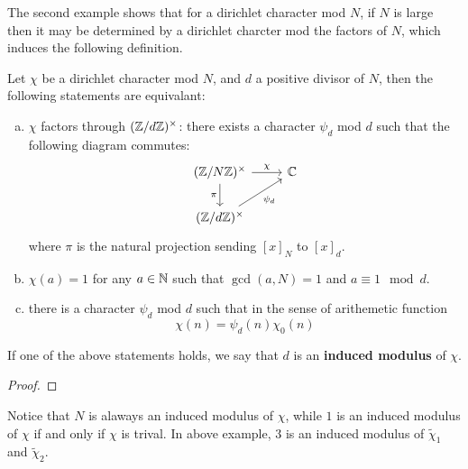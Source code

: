 The second example shows that for a dirichlet character mod \(N\), if \(N\) is large then it may be determined by a dirichlet charcter mod the factors of \(N\), which induces the following definition.

\begin{lemma}
    Let \(\chi\) be a dirichlet character mod \(N\), and \(d \) a positive divisor of \(N\), then the following statements are equivalant:
    \begin{enumerate} [(a)]
        \item \(\chi\) factors through \((\mathbb{Z}/d\mathbb{Z})^\times\): there exists a character \(\psi_d\) mod \(d\) such that the following diagram commutes:
\[\begin{tikzcd}
	{(\mathbb{Z}/N\mathbb{Z})^\times} & {\mathbb{C}} \\
	{(\mathbb{Z}/d\mathbb{Z})^\times}
	\arrow["\chi", from=1-1, to=1-2]
	\arrow["\pi"', from=1-1, to=2-1]
	\arrow["{\psi_d}"', from=2-1, to=1-2]
\end{tikzcd}\]
        where \(\pi\) is the natural projection sending \([x]_N\) to \([x]_d\).
        \item \(\chi(a) = 1\) for any \(a \in \mathbb{N}\) such that \(\gcd(a,N) = 1\) and \(a \equiv 1 \mod d\).
        
        \item there is a character \(\psi_d\) mod \(d\) such that in the sense of arithemetic function
        \[\chi(n) = \psi_d(n)\chi_0(n)\]
    \end{enumerate}
    If one of the above statements holds, we say that \(d\) is an \textbf{induced modulus} of \(\chi\).
\end{lemma}

\begin{proof}
    
\end{proof}

\begin{remark}
    Notice that \(N\) is alaways an induced modulus of \(\chi\), while \(1\) is an induced modulus of \(\chi\) if and only if \(\chi\) is trival. In above example, \(3\) is an induced modulus of \(\tilde{\chi}_1\) and \(\tilde{\chi}_2\).
\end{remark}



